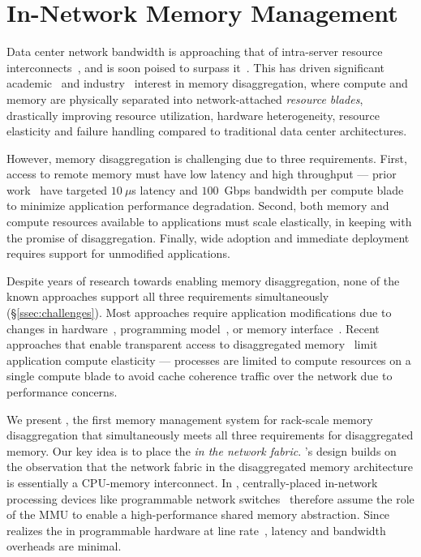 \section{In-Network Memory Management}
\label{sec:mindintro}

Data center network bandwidth is approaching that of intra-server resource interconnects~\cite{terabitethernet, remotememory}, and is soon poised to surpass it~\cite{legoosatc}. This has driven significant academic~\cite{memdisagg2, memdisagg3, memdisagg4, memdisagg5, memdisagg6, memdisagg1, legoos, infiniswap, fastswap, disagg, disaggfault} and industry~\cite{industry0, industry1, industry2, industry3, industry4, industry5} interest in memory disaggregation, where compute and memory are physically separated into network-attached \textit{resource blades}, drastically improving resource utilization, hardware heterogeneity, resource elasticity and failure handling compared to traditional data center architectures. 

However, memory disaggregation is challenging due to three requirements. First,  access to remote memory must have low latency and high throughput --- prior work~\cite{legoos, infiniswap, fastswap, disagg} have targeted $10~\mu$s latency and $100$~Gbps bandwidth per compute blade to minimize application performance degradation. Second,  both memory and compute resources available to applications must scale elastically, in keeping with the promise of disaggregation. Finally, wide adoption and immediate deployment requires support for unmodified applications.

Despite years of research towards enabling memory disaggregation, none of the known approaches support all three requirements simultaneously (\S\ref{ssec:challenges}). Most approaches require application modifications due to changes in hardware~\cite{industry1, industry2, nwsupport, memdisagg4}, programming model~\cite{piccolo, grappa}, or memory interface~\cite{farm, ramcloud, herd}. Recent approaches that enable transparent access to disaggregated memory~\cite{legoos, infiniswap, fastswap} limit application compute elasticity --- processes are limited to compute resources on a single compute blade to avoid cache coherence traffic over the network due to performance concerns.

We present \mind, the first memory management system for rack-scale memory disaggregation that simultaneously meets all three requirements for disaggregated memory. Our key idea is to place the \mmm \textit{in the network fabric}. \mind's design builds on the observation that the network fabric in the disaggregated memory architecture is essentially a CPU-memory interconnect. In \mind, centrally-placed in-network processing devices like programmable network switches~\cite{progswitch1, progswitch2, progswitch3} therefore assume the role of the MMU to enable a high-performance shared memory abstraction. Since \mind realizes the \mmm in programmable hardware at line rate~\cite{progswitch1}, latency and bandwidth overheads are minimal. 

